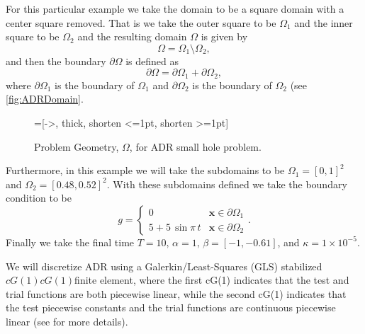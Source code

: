     For this particular example we take the domain to be a square domain with a
    center square removed. That is we take the outer square to be $\Omega_1$ and
    the inner square to be $\Omega_2$ and the resulting domain $\Omega$ is given
    by
    \begin{equation}
        \Omega = \Omega_1\setminus \Omega_2,
        \label{eq:ADRDomain}
    \end{equation}
    and then the boundary $\partial \Omega$ is defined as
    \begin{equation}
        \partial \Omega = \partial \Omega_1 + \partial \Omega_2,
        \label{eq:ADRBoundary}
    \end{equation}
    where $\partial \Omega_1$ is the boundary of $\Omega_1$ and $\partial
    \Omega_2$ is the boundary of $\Omega_2$ (see \autoref{fig:ADRDomain}.

    \begin{figure}[h]
        \centering
        =[->, thick, shorten <=1pt, shorten >=1pt]
        \caption{Problem Geometry, $\Omega$, for ADR small hole problem.}
        \label{fig:ADRDomain}
    \end{figure}

    Furthermore, in this example we will take the subdomains to be $\Omega_1 =
    [0,1]^2$ and $\Omega_2 = [0.48,0.52]^2$. With these subdomains defined we
    take the boundary condition to be
    \begin{equation}
        g = \begin{cases}
            0   &\mathbf{x} \in \partial \Omega_1 \\
            5 + 5\, \sin \pi\, t  &\mathbf{x} \in \partial \Omega_2
        \end{cases}.
        \label{eq:ADRBCs}
    \end{equation}
    Finally we take the final time $T=10,\, \alpha=1,\, \beta = \left[ -1,
    -0.61 \right]$, and $\kappa = 1\times10^{-5}$.

    We will discretize ADR using a Galerkin\slash Least-Squares (GLS) stabilized
    $cG(1)cG(1)$finite element, where the first cG(1) indicates that the test and
    trial functions are both piecewise linear, while the second cG(1) indicates
    that the test piecewise constants and the trial functions are continuous
    piecewise linear (see \cite{Hoffman2006a} for more details).


